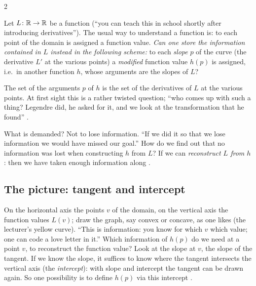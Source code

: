 \begin{paracol}{2}
\begin{definition}\label{def:lt-question}
Let $L\colon\mathbb{R}\to\mathbb{R}$ be a function (``you can teach this in school shortly after introducing derivatives''). The usual way to understand a function is: to each point of the domain is assigned a function value. \emph{Can one store the information contained in $L$ instead in the following scheme:} to each \emph{slope} $p$ of the curve (the derivative $L'$ at the various points) a \emph{modified} function value $h(p)$ is assigned, i.e.\ in another function $h$, whose arguments are the slopes of $L$? 
\end{definition}
The set of the arguments $p$ of $h$ is the set of the derivatives of $L$ at the various points. At first sight this is a rather twisted question; ``who comes up with such a thing? Legendre did, he asked for it, and we look at the transformation that he found'' .

What is demanded? Not to lose information. ``If we did it so that we lose information we would have missed our goal.'' How do we find out that no information was lost when constructing $h$ from $L$? If we can \emph{reconstruct $L$ from $h$}: then we have taken enough information along .

\subsection{The picture: tangent and intercept}\label{ssec:lt-picture}

On the horizontal axis the points $v$ of the domain, on the vertical axis the function values $L(v)$; draw the graph, say convex or concave, as one likes (the lecturer's yellow curve). ``This is information: you know for which $v$ which value; one can code a love letter in it.'' Which information of $h(p)$ do we need at a point $v$, to reconstruct the function value? Look at the slope at $v$, the slope of the tangent. If we know the slope, it suffices to know where the tangent intersects the vertical axis (the \emph{intercept}): with slope and intercept the tangent can be drawn again. So one possibility is to define $h(p)$ via this intercept .


\end{paracol}
